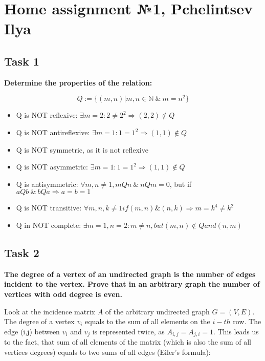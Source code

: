 \section{Home assignment №1, Pchelintsev Ilya}

\subsection{Task 1}
\begin{center}
\textbf{Determine the properties of the relation:}
\end{center}
\[ Q := \{(m,n) | m,n \in \mathbb{N}\ \& \ m = n^2\} \]

\begin{itemize}
\item Q is NOT reflexive: $\exists m = 2: 2 \neq 2^2 \Rightarrow (2,2) \notin Q$
\item Q is NOT antireflexive: $\exists m = 1: 1 = 1^2 \Rightarrow (1,1) \notin Q$
\item Q is NOT symmetric, as it is not reflexive
\item Q is NOT asymmetric: $\exists m = 1: 1 = 1^2 \Rightarrow (1,1) \notin Q$
\item Q is antisymmetric: $\forall m, n \neq 1, mQn\ \& \ nQm = 0$, but if $aQb\ \& \ bQa \Rightarrow a = b = 1$
\item Q is NOT transitive: $\forall m,n,k \neq 1 if (m,n) \& (n,k) \Rightarrow m = k^4 \neq k^2$
\item Q in NOT complete: $\exists m=1, n=2: m \neq n, but (m,n) \notin Q and (n,m)$
\end{itemize}

\subsection{Task 2}
\begin{center}
\textbf{
The degree of a vertex of an undirected graph is the number of edges incident to the vertex.
 Prove that in an arbitrary graph the number of vertices with odd degree is even.}
\end{center}
Look at the incidence matrix $A$ of the arbitrary undirected graph $G=(V,E)$.
The degree of a vertex $v_i$ equals to the sum of all elements on the $i-th$ row. 
The edge (i,j) between $v_i$ and $v_j$ is represented twice, as $A_{i,j}=A_{j,i} = 1$.
This leads us to the fact, that sum of all elements of the matrix (which is also the sum of all vertices degrees) equals to two sums of all edges (Eiler's formula):

